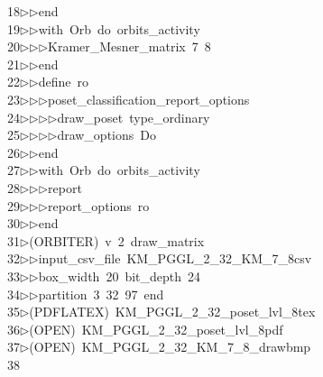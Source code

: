 \begin{tabbing}
18\>$\triangleright$\>$\triangleright$\>end\ \\[0pt]
19\>$\triangleright$\>$\triangleright$\>with\ Orb\ do\ orbits\_activity\ \\[0pt]
20\>$\triangleright$\>$\triangleright$\>$\triangleright$\>Kramer\_Mesner\_matrix\ 7\ 8\ \\[0pt]
21\>$\triangleright$\>$\triangleright$\>end\ \\[0pt]
22\>$\triangleright$\>$\triangleright$\>define\ ro\ \\[0pt]
23\>$\triangleright$\>$\triangleright$\>$\triangleright$\>poset\_classification\_report\_options\ \\[0pt]
24\>$\triangleright$\>$\triangleright$\>$\triangleright$\>$\triangleright$\>draw\_poset\ type\_ordinary\ \\[0pt]
25\>$\triangleright$\>$\triangleright$\>$\triangleright$\>$\triangleright$\>draw\_options\ Do\ \\[0pt]
26\>$\triangleright$\>$\triangleright$\>end\ \\[0pt]
27\>$\triangleright$\>$\triangleright$\>with\ Orb\ do\ orbits\_activity\ \\[0pt]
28\>$\triangleright$\>$\triangleright$\>$\triangleright$\>report\ \ \\[0pt]
29\>$\triangleright$\>$\triangleright$\>$\triangleright$\>report\_options\ ro\ \\[0pt]
30\>$\triangleright$\>$\triangleright$\>end\ \\[0pt]
31\>$\triangleright$\>(ORBITER)\ v\ 2\ draw\_matrix\ \\[0pt]
32\>$\triangleright$\>$\triangleright$\>input\_csv\_file\ KM\_PGGL\_2\_32\_KM\_7\_8csv\ \\[0pt]
33\>$\triangleright$\>$\triangleright$\>box\_width\ 20\ bit\_depth\ 24\ \\[0pt]
34\>$\triangleright$\>$\triangleright$\>partition\ 3\ 32\ 97\ end\\[0pt]
35\>$\triangleright$\>(PDFLATEX)\ KM\_PGGL\_2\_32\_poset\_lvl\_8tex\\[0pt]
36\>$\triangleright$\>(OPEN)\ KM\_PGGL\_2\_32\_poset\_lvl\_8pdf\\[0pt]
37\>$\triangleright$\>(OPEN)\ KM\_PGGL\_2\_32\_KM\_7\_8\_drawbmp\\[0pt]
38\>\end{tabbing}
